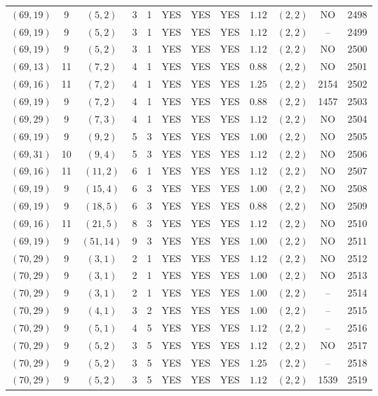 \begin{longtable}{|c|c|c|c|c|c|c|c|c|c|c|c|}
$(69,19)$ & 9 & $(5,2)$ & 3 & 1 & YES & YES & YES & $1.12$ & $(2,2)$ & NO & 2498\\
$(69,19)$ & 9 & $(5,2)$ & 3 & 1 & YES & YES & YES & $1.12$ & $(2,2)$ & -- & 2499\\
$(69,19)$ & 9 & $(5,2)$ & 3 & 1 & YES & YES & YES & $1.12$ & $(2,2)$ & NO & 2500\\
$(69,13)$ & 11 & $(7,2)$ & 4 & 1 & YES & YES & YES & $0.88$ & $(2,2)$ & NO & 2501\\
$(69,16)$ & 11 & $(7,2)$ & 4 & 1 & YES & YES & YES & $1.25$ & $(2,2)$ & 2154 & 2502\\
$(69,19)$ & 9 & $(7,2)$ & 4 & 1 & YES & YES & YES & $0.88$ & $(2,2)$ & 1457 & 2503\\
$(69,29)$ & 9 & $(7,3)$ & 4 & 1 & YES & YES & YES & $1.12$ & $(2,2)$ & NO & 2504\\
$(69,19)$ & 9 & $(9,2)$ & 5 & 3 & YES & YES & YES & $1.00$ & $(2,2)$ & NO & 2505\\
$(69,31)$ & 10 & $(9,4)$ & 5 & 3 & YES & YES & YES & $1.12$ & $(2,2)$ & NO & 2506\\
$(69,16)$ & 11 & $(11,2)$ & 6 & 1 & YES & YES & YES & $1.12$ & $(2,2)$ & NO & 2507\\
$(69,19)$ & 9 & $(15,4)$ & 6 & 3 & YES & YES & YES & $1.00$ & $(2,2)$ & NO & 2508\\
$(69,19)$ & 9 & $(18,5)$ & 6 & 3 & YES & YES & YES & $0.88$ & $(2,2)$ & NO & 2509\\
$(69,16)$ & 11 & $(21,5)$ & 8 & 3 & YES & YES & YES & $1.12$ & $(2,2)$ & NO & 2510\\
$(69,19)$ & 9 & $(51,14)$ & 9 & 3 & YES & YES & YES & $1.00$ & $(2,2)$ & NO & 2511\\
$(70,29)$ & 9 & $(3,1)$ & 2 & 1 & YES & YES & YES & $1.12$ & $(2,2)$ & NO & 2512\\
$(70,29)$ & 9 & $(3,1)$ & 2 & 1 & YES & YES & YES & $1.00$ & $(2,2)$ & NO & 2513\\
$(70,29)$ & 9 & $(3,1)$ & 2 & 1 & YES & YES & YES & $1.00$ & $(2,2)$ & -- & 2514\\
$(70,29)$ & 9 & $(4,1)$ & 3 & 2 & YES & YES & YES & $1.00$ & $(2,2)$ & -- & 2515\\
$(70,29)$ & 9 & $(5,1)$ & 4 & 5 & YES & YES & YES & $1.12$ & $(2,2)$ & -- & 2516\\
$(70,29)$ & 9 & $(5,2)$ & 3 & 5 & YES & YES & YES & $1.12$ & $(2,2)$ & NO & 2517\\
$(70,29)$ & 9 & $(5,2)$ & 3 & 5 & YES & YES & YES & $1.25$ & $(2,2)$ & -- & 2518\\
$(70,29)$ & 9 & $(5,2)$ & 3 & 5 & YES & YES & YES & $1.12$ & $(2,2)$ & 1539 & 2519\\

\end{longtable}
